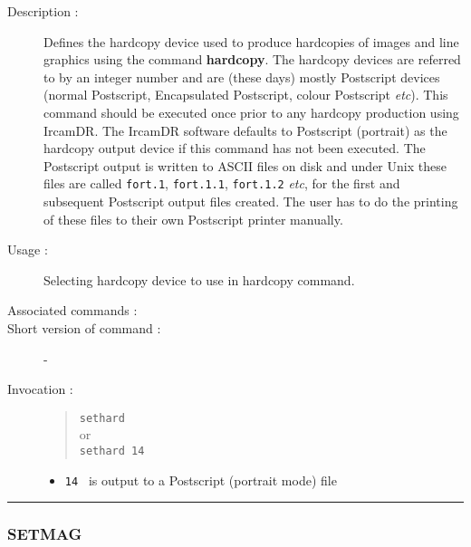 \begin{description}

\item[Description :] Defines the hardcopy device used to produce
hardcopies of images and line graphics using the command {\bf hardcopy}.  The
hardcopy devices are referred to by an integer number and are (these
days) mostly Postscript devices (normal Postscript, Encapsulated
Postscript, colour Postscript \emph{etc}).  This command should be
executed once prior to any hardcopy production using {\sc IrcamDR}.
The {\sc IrcamDR} software defaults to Postscript (portrait) as the
hardcopy output device if this command has not been executed.  The
Postscript output is written to ASCII files on disk and under Unix
these files are called {\tt fort.1}, {\tt fort.1.1}, {\tt fort.1.2}
\emph{etc}, for the first and subsequent Postscript output files
created.  The user has to do the printing of these files to their own
Postscript printer manually.

\item[Usage :] Selecting hardcopy device to use in hardcopy command.
\item[Associated commands :] {\tt {}}
\item[Short version of command :] -
\item[Invocation :]

\begin{quote}{\tt  sethard }\\
or \\
{\tt sethard 14 }
\end{quote}

\begin{itemize}

\item {\tt 14 } is output to a Postscript (portrait mode) file
\end{itemize}

\end{description}

\hrule 
\subsubsection*{\label{SETMAG}SETMAG}

